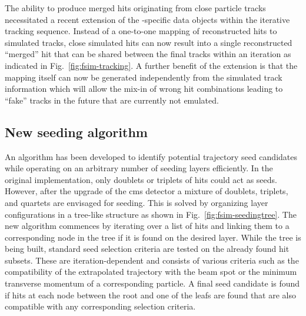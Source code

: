 The ability to produce merged hits originating from close particle tracks necessitated a recent extension of the \FSIM{}-specific data objects within the iterative tracking sequence. Instead of a one-to-one mapping of reconstructed hits to simulated tracks, close simulated hits can now result into a single reconstructed ``merged'' hit that can be shared between the final tracks within an iteration as indicated in Fig.~\ref{fig:fsim-tracking}. A further benefit of the extension is that the mapping itself can now be generated independently from the simulated track information which will allow the mix-in of wrong hit combinations leading to ``fake'' tracks in the future that are currently not emulated.


\subsection{New seeding algorithm}
\label{sec:fsim-seeding}

An algorithm has been developed to identify potential trajectory seed candidates while operating on an arbitrary number of seeding layers efficiently. In the original implementation, only doublets or triplets of hits could act as seeds. However, after the upgrade of the \gls{cms} detector a mixture of doublets, triplets, and quartets are envisaged for seeding. This is solved by organizing layer configurations in a tree-like structure as shown in Fig.~\ref{fig:fsim-seedingtree}. The new algorithm commences by iterating over a list of hits and linking them to a corresponding node in the tree if it is found on the desired layer. While the tree is being built, standard seed selection criteria are tested on the already found hit subsets. These are iteration-dependent and consists of various criteria such as the compatibility of the extrapolated trajectory with the beam spot or the minimum transverse momentum of a corresponding particle. A final seed candidate is found if hits at each node between the root and one of the leafs are found that are also compatible with any corresponding selection criteria. 




